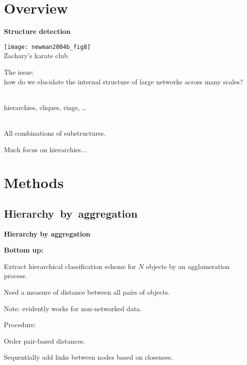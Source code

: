 \section{Overview}

  \textbf{Structure detection}

      
    \texttt{[image: newman2004b\_fig8]} \\
    {\small {} Zachary's karate club\cite{zachary1977a,newman2004b}}
    
    
     
      \alert{The issue:}\\
      how do we elucidate
      the internal structure of
      large networks across many
      scales?
    
  
  \bigskip

  {
    
     
      \\
      hierarchies, cliques, rings, \ldots
     
      \\
      All combinations of substructures.
     
      Much focus on hierarchies...
    
  }



\section{Methods}

\subsection{Hierarchy\ by\ aggregation}

  \textbf{Hierarchy by aggregation}

  \textbf{Bottom up:}
    
     
       Extract hierarchical
      classification scheme for $N$ objects by an agglomeration process.
     
      Need a measure of distance between all pairs of objects.
    
      Note: evidently works for non-networked data.
    
      \alert{Procedure:}
      
       
        Order pair-based distances.
       
        Sequentially add links between nodes based on closeness.
       
